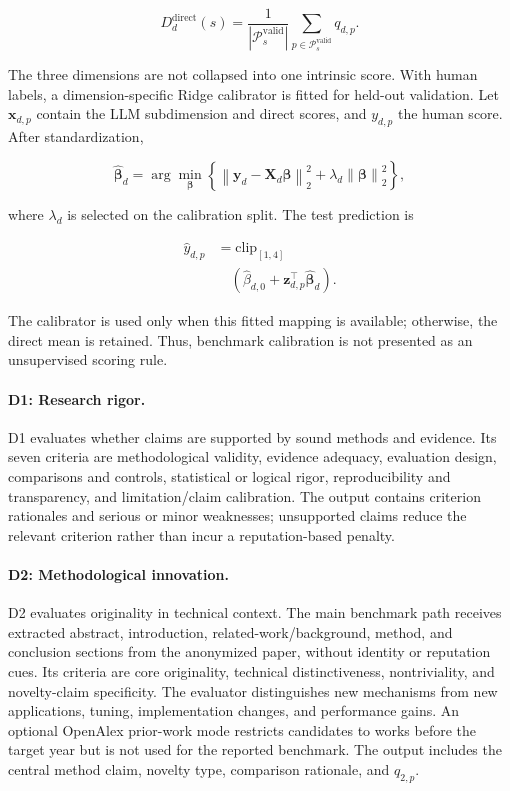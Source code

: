 \documentclass[letterpaper]{article} %
\begin{document}
\begin{equation}
D_d^{\mathrm{direct}}(s)=
\frac{1}{|\mathcal{P}_s^{\mathrm{valid}}|}
\sum_{p\in\mathcal{P}_s^{\mathrm{valid}}}q_{d,p}.
\end{equation}

The three dimensions are not collapsed into one intrinsic score. With human labels, a dimension-specific Ridge calibrator is fitted for held-out validation. Let $\mathbf{x}_{d,p}$ contain the LLM subdimension and direct scores, and $y_{d,p}$ the human score. After standardization,

\begin{equation}
\widehat{\boldsymbol{\beta}}_d
=\arg\min_{\boldsymbol{\beta}}
\left\{
\left\|\mathbf{y}_d-\mathbf{X}_d\boldsymbol{\beta}\right\|_2^2
+\lambda_d\left\|\boldsymbol{\beta}\right\|_2^2
\right\},
\end{equation}

where $\lambda_d$ is selected on the calibration split. The test prediction is

\begin{equation}
\begin{aligned}
\widehat{y}_{d,p}&=\mathrm{clip}_{[1,4]}\\
&\quad\left(\widehat{\beta}_{d,0}+\mathbf{z}_{d,p}^{\top}
\widehat{\boldsymbol{\beta}}_d\right).
\end{aligned}
\end{equation}

The calibrator is used only when this fitted mapping is available; otherwise, the direct mean is retained. Thus, benchmark calibration is not presented as an unsupervised scoring rule.

\paragraph{D1: Research rigor.}
D1 evaluates whether claims are supported by sound methods and evidence. Its seven criteria are methodological validity, evidence adequacy, evaluation design, comparisons and controls, statistical or logical rigor, reproducibility and transparency, and limitation/claim calibration. The output contains criterion rationales and serious or minor weaknesses; unsupported claims reduce the relevant criterion rather than incur a reputation-based penalty.

\paragraph{D2: Methodological innovation.}
D2 evaluates originality in technical context. The main benchmark path receives extracted abstract, introduction, related-work/background, method, and conclusion sections from the anonymized paper, without identity or reputation cues. Its criteria are core originality, technical distinctiveness, nontriviality, and novelty-claim specificity. The evaluator distinguishes new mechanisms from new applications, tuning, implementation changes, and performance gains. An optional OpenAlex prior-work mode restricts candidates to works before the target year but is not used for the reported benchmark. The output includes the central method claim, novelty type, comparison rationale, and $q_{2,p}$.
\end{document}
